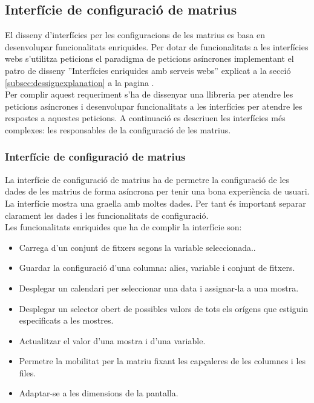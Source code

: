 \subsection{Interf\'{i}cie de configuraci\'{o} de matrius}
El disseny d'interfícies per les configuracions de les matrius es basa en desenvolupar funcionalitats enriquides\cite{ria}. Per dotar de funcionalitats a les interfícies webs s'utilitza peticions el paradigma de peticions asíncrones implementant el patro de disseny ''Interfícies enriquides amb serveis webs'' explicat a la secció \ref{subsec:dessignexplanation} a la pagina \pageref{ria}.\cite{asyncronous}\\ 

Per complir aquest requeriment s'ha de dissenyar una llibreria per atendre les peticions asíncrones i desenvolupar funcionalitats a les interfícies per atendre les respostes a aquestes peticions. A continuaci\'{o} es descriuen les interf\'{i}cies m\'{e}s complexes: les responsables de la configuraci\'{o} de les matrius.

\subsubsection{Interf\'{i}cie de configuraci\'{o} de matrius}
La interfície de configuració de matrius ha de permetre la configuració de les dades de les matrius de forma asíncrona per tenir una bona experiència de usuari. La interfície mostra una graella amb moltes dades. Per tant \'{e}s important separar clarament les dades i les funcionalitats de configuració.\\

Les funcionalitats enriquides que ha de complir la interfície son:
\begin{itemize}
\item Carrega d'un conjunt de fitxers segons la variable seleccionada..
\item Guardar la configuració d'una columna: alies, variable i conjunt de fitxers.
\item Desplegar un calendari per seleccionar una data i assignar-la a una mostra.
\item Desplegar un selector obert de possibles valors de tots els orígens que estiguin especificats a les mostres.
\item Actualitzar el valor d'una mostra i d'una variable.
\item Permetre la mobilitat per la matriu fixant les capçaleres de les columnes i les files.
\item Adaptar-se a les dimensions de la pantalla.
\end{itemize}

